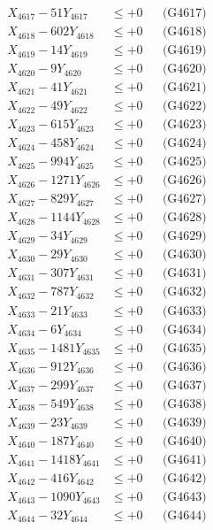 \documentclass[a4paper,10pt]{article}
\begin{document}
{\begin{align}
X_{4617} - 51Y_{4617} &\leq +0 && \text{(G4617)} \\
X_{4618} - 602Y_{4618} &\leq +0 && \text{(G4618)} \\
X_{4619} - 14Y_{4619} &\leq +0 && \text{(G4619)} \\
X_{4620} - 9Y_{4620} &\leq +0 && \text{(G4620)} \\
\allowbreak
X_{4621} - 41Y_{4621} &\leq +0 && \text{(G4621)} \\
X_{4622} - 49Y_{4622} &\leq +0 && \text{(G4622)} \\
X_{4623} - 615Y_{4623} &\leq +0 && \text{(G4623)} \\
X_{4624} - 458Y_{4624} &\leq +0 && \text{(G4624)} \\
X_{4625} - 994Y_{4625} &\leq +0 && \text{(G4625)} \\
X_{4626} - 1271Y_{4626} &\leq +0 && \text{(G4626)} \\
X_{4627} - 829Y_{4627} &\leq +0 && \text{(G4627)} \\
X_{4628} - 1144Y_{4628} &\leq +0 && \text{(G4628)} \\
X_{4629} - 34Y_{4629} &\leq +0 && \text{(G4629)} \\
X_{4630} - 29Y_{4630} &\leq +0 && \text{(G4630)} \\
\allowbreak
X_{4631} - 307Y_{4631} &\leq +0 && \text{(G4631)} \\
X_{4632} - 787Y_{4632} &\leq +0 && \text{(G4632)} \\
X_{4633} - 21Y_{4633} &\leq +0 && \text{(G4633)} \\
X_{4634} - 6Y_{4634} &\leq +0 && \text{(G4634)} \\
X_{4635} - 1481Y_{4635} &\leq +0 && \text{(G4635)} \\
X_{4636} - 912Y_{4636} &\leq +0 && \text{(G4636)} \\
X_{4637} - 299Y_{4637} &\leq +0 && \text{(G4637)} \\
X_{4638} - 549Y_{4638} &\leq +0 && \text{(G4638)} \\
X_{4639} - 23Y_{4639} &\leq +0 && \text{(G4639)} \\
X_{4640} - 187Y_{4640} &\leq +0 && \text{(G4640)} \\
\allowbreak
X_{4641} - 1418Y_{4641} &\leq +0 && \text{(G4641)} \\
X_{4642} - 416Y_{4642} &\leq +0 && \text{(G4642)} \\
X_{4643} - 1090Y_{4643} &\leq +0 && \text{(G4643)} \\
X_{4644} - 32Y_{4644} &\leq +0 && \text{(G4644)} \\

\end{align}}
\end{document}
